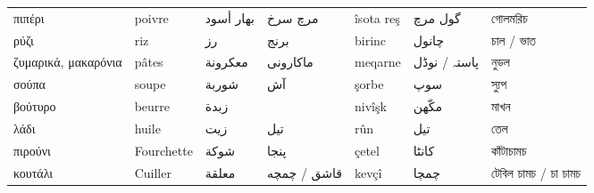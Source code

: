\begin{longtable}{p{3.5cm} p{3.5cm} p{3.5cm} p{3.5cm} p{3.5cm} p{3.5cm} p{3.5cm} }
 πιπέρι                                     & poivre                                                           & بهار أسود                        & مرچ سرخ             & îsota reş                  & گول مرچ                                               & গোলমরিচ                                     \\
 ρύζι                                       & riz                                                              & رز                               & برنج                & birinc                     & چانول                                                 & চাল / ভাত                                   \\
 ζυμαρικά, μακαρόνια                        & pâtes                                                            & معكرونة                          & ماکارونی            & meqarne                    & پاستہ / نوڈل                                          & নুডল                                        \\
 σούπα                                      & soupe                                                            & شوربة                            & آش                  & şorbe                      & سوپ                                                   & স্যুপ                                       \\
 βούτυρο                                    & beurre                                                           & زبدة                             &                     & nivîşk                     & مکّھن                                                 & মাখন                                        \\
 λάδι                                       & huile                                                            & زيت                              & تیل                 & rûn                        & تیل                                                   & তেল                                         \\
 πιρούνι                                    & Fourchette                                                       & شوكة                             & پنجا                & çetel                      & کانٹا                                                 & কাঁটাচামচ                                   \\
 κουτάλι                                    & Cuiller                                                          & معلقة                            & قاشق / چمچه         & kevçî                      & چمچا                                                  & টেবিল চামচ / চা চামচ                        \\

\end{longtable}
